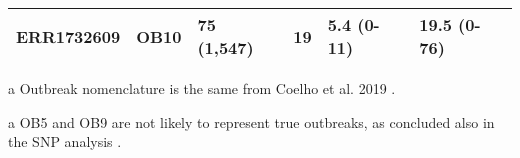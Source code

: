 \begin{table}[!ht]
{\begin{threeparttable}[b]
\begin{tabular}{@{}llllll@{}}
        ERR1732609 & OB10 & 75 (1,547) & 19 & 5.4 (0-11) & 19.5 (0-76) \\
        \bottomrule
    \end{tabular}
    \begin{tablenotes}
       \item [a] {\footnotesize Outbreak nomenclature is the same from Coelho et al. 2019 \cite{coelho_genomic_2019}.}
       \item [a] {\footnotesize OB5 and OB9 are not likely to represent true outbreaks, as concluded also in the \ac{SNP} analysis \cite{coelho_genomic_2019}.}
    \end{tablenotes}
    \end{threeparttable}
    }
\end{table}


